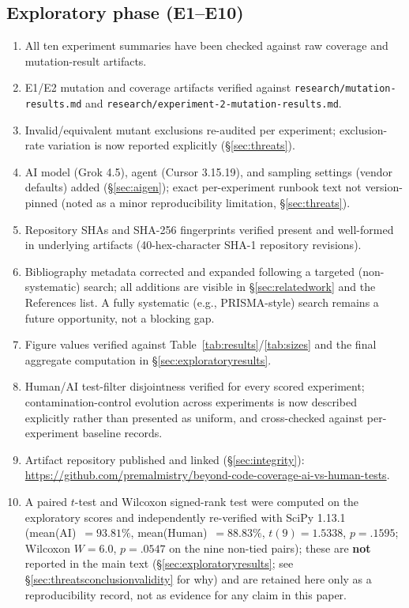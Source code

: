 \documentclass[10pt,conference]{IEEEtran}
\begin{document}
\subsection{Exploratory phase (E1--E10)}
\begin{enumerate}
\item All ten experiment summaries have been checked against raw coverage and mutation-result artifacts.
\item E1/E2 mutation and coverage artifacts verified against \texttt{research/mutation-results.md} and \texttt{research/experiment-2-mutation-results.md}.
\item Invalid/equivalent mutant exclusions re-audited per experiment; exclusion-rate variation is now reported explicitly (\S\ref{sec:threats}).
\item AI model (Grok 4.5), agent (Cursor 3.15.19), and sampling settings (vendor defaults) added (\S\ref{sec:aigen}); exact per-experiment runbook text not version-pinned (noted as a minor reproducibility limitation, \S\ref{sec:threats}).
\item Repository SHAs and SHA-256 fingerprints verified present and well-formed in underlying artifacts (40-hex-character SHA-1 repository revisions).
\item Bibliography metadata corrected and expanded following a targeted (non-systematic) search; all additions are visible in \S\ref{sec:relatedwork} and the References list. A fully systematic (e.g., PRISMA-style) search remains a future opportunity, not a blocking gap.
\item Figure values verified against Table~\ref{tab:results}/\ref{tab:sizes} and the final aggregate computation in \S\ref{sec:exploratoryresults}.
\item Human/AI test-filter disjointness verified for every scored experiment; contamination-control evolution across experiments is now described explicitly rather than presented as uniform, and cross-checked against per-experiment baseline records.
\item Artifact repository published and linked (\S\ref{sec:integrity}): \url{https://github.com/premalmistry/beyond-code-coverage-ai-vs-human-tests}.
\item A paired $t$-test and Wilcoxon signed-rank test were computed on the exploratory scores and independently re-verified with SciPy 1.13.1 (mean(AI)~$=93.81\%$, mean(Human)~$=88.83\%$, $t(9)=1.5338$, $p=.1595$; Wilcoxon $W=6.0$, $p=.0547$ on the nine non-tied pairs); these are \textbf{not} reported in the main text (\S\ref{sec:exploratoryresults}; see \S\ref{sec:threatsconclusionvalidity} for why) and are retained here only as a reproducibility record, not as evidence for any claim in this paper.
\end{enumerate}
\end{document}
